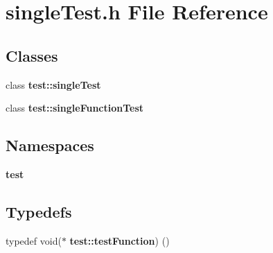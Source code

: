 \section{single\+Test.\+h File Reference}
\label{singleTest_8h}
\subsection*{Classes}
\begin{DoxyCompactItemize}
\item 
class {\bf test\+::single\+Test}
\item 
class {\bf test\+::single\+Function\+Test}
\end{DoxyCompactItemize}
\subsection*{Namespaces}
\begin{DoxyCompactItemize}
\item 
 {\bf test}
\end{DoxyCompactItemize}
\subsection*{Typedefs}
\begin{DoxyCompactItemize}
\item 
typedef void($\ast$ {\bf test\+::test\+Function}) ()
\end{DoxyCompactItemize}

